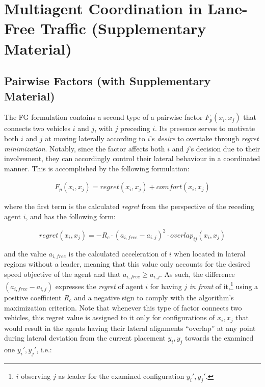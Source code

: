 \section{Multiagent Coordination in Lane-Free Traffic (Supplementary Material)}\label{sec:mas_lf2}




\subsection{Pairwise Factors (with Supplementary Material)}\label{subsec:fg_lf2}


The FG formulation contains a second type of a pairwise factor $F_{p}(x_i,x_j)$ that connects two vehicles $i$ and $j$, with $j$ preceding $i$. Its presence serves to motivate both $i$ and $j$ at moving laterally according to $i$'s {\em desire} to overtake through {\em regret minimization}.
Notably, since the factor affects both $i$ and $j$'s decision due to their involvement, they can accordingly control their lateral behaviour in a coordinated manner.
This is accomplished by the following formulation:


%
\begin{align}\label{eq:f_ij_s}
    F_{p}(x_i,x_j) = regret(x_i,x_j) + comfort(x_i,x_j)
\end{align}
%

\noindent where the first term is the calculated {\em regret} from the perspective of the receding agent $i$, and has the following form:


\begin{equation}\label{eq:regret_s}
    regret(x_i,x_j) = -R_c\cdot (a_{i,free} - a_{i, j})^2 \cdot overlap_{ij}(x_i,x_j)
\end{equation}

\noindent and the value $a_{i,free}$ is the calculated acceleration of $i$ when located in lateral regions without a leader, meaning that this value only accounts for the desired speed objective of the agent and that $a_{i,free}\geq a_{i,j}$.
As such, the difference $(a_{i,free} - a_{i, j})$ expresses the {\em regret} of agent $i$ for having $j$ {\em in front} of it,\footnote{$i$ observing $j$ as leader for the examined configuration $y_i',y_j'$.} using a positive coefficient $R_c$ and a negative sign to comply with the algorithm's maximization criterion.
Note that whenever this type of factor connects two vehicles, this regret value is assigned to it only for configurations of $x_i,x_j$ that would result in the agents having their lateral alignments ``overlap'' at any point during lateral deviation from the current placement $y_i,y_j$ towards the examined one $y_i',y_j'$, i.e.:


